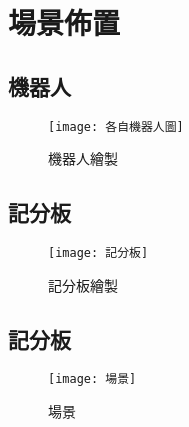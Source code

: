 \chapter{場景佈置}
\section{機器人}
\begin{figure}[hbt!]
\begin{center}
\label{各自機器人圖}
\texttt{[image: 各自機器人圖]}
\caption{\Large 機器人繪製}
\end{center}
\end{figure}
\newpage

\section{記分板}
\begin{figure}[hbt!]
\begin{center}
\label{記分板}
\texttt{[image: 記分板]}
\caption{\Large 記分板繪製}
\end{center}
\end{figure}

\section{記分板}
\begin{figure}[hbt!]
\begin{center}
\label{場景}
\texttt{[image: 場景]}
\caption{\Large 場景}
\end{center}
\end{figure}
\newpage

